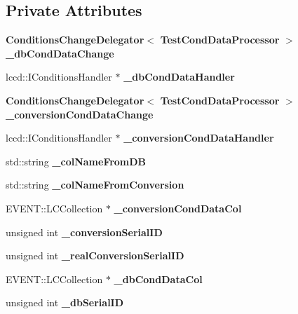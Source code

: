 \subsection*{Private Attributes}
\begin{DoxyCompactItemize}
\item 
{\bf ConditionsChangeDelegator}$<$ {\bf TestCondDataProcessor} $>$ {\bfseries \_\-dbCondDataChange}\label{classTestCondDataProcessor_ab49c37286bd6ac0b403d1b8063f6bcde}

\item 
lccd::IConditionsHandler $\ast$ {\bfseries \_\-dbCondDataHandler}\label{classTestCondDataProcessor_ae03a6373512f70ad3691243833b50fc5}

\item 
{\bf ConditionsChangeDelegator}$<$ {\bf TestCondDataProcessor} $>$ {\bfseries \_\-conversionCondDataChange}\label{classTestCondDataProcessor_ab98e3556c74baf67a8ce442fe9cecf93}

\item 
lccd::IConditionsHandler $\ast$ {\bfseries \_\-conversionCondDataHandler}\label{classTestCondDataProcessor_a2bbe530d11b1b857ce8bd5ddd2cc1c4c}

\item 
std::string {\bfseries \_\-colNameFromDB}\label{classTestCondDataProcessor_adbf9b678cf507bc9d964e2b40199d2ad}

\item 
std::string {\bfseries \_\-colNameFromConversion}\label{classTestCondDataProcessor_a0e4d01ed84ec9bb9985fe9ec84049295}

\item 
EVENT::LCCollection $\ast$ {\bfseries \_\-conversionCondDataCol}\label{classTestCondDataProcessor_a7a29dd0b074438f7c31d3fe920240c1d}

\item 
unsigned int {\bfseries \_\-conversionSerialID}\label{classTestCondDataProcessor_af0b3f5595528c4f7a4f507dc9b45d89f}

\item 
unsigned int {\bfseries \_\-realConversionSerialID}\label{classTestCondDataProcessor_aacdd9af5954291ecd0e7b02bd545c772}

\item 
EVENT::LCCollection $\ast$ {\bfseries \_\-dbCondDataCol}\label{classTestCondDataProcessor_afc8c3bce6dae88d7abe3f6655af277fb}

\item 
unsigned int {\bfseries \_\-dbSerialID}\label{classTestCondDataProcessor_ac51866b83d58c3df68a9aad5cc3f361c}


\end{DoxyCompactItemize}
